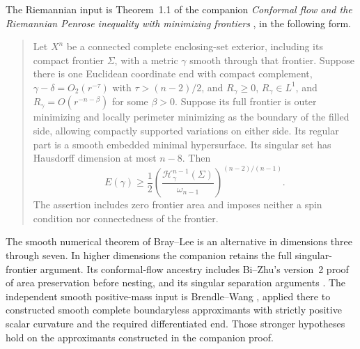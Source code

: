 The Riemannian input is Theorem~1.1 of the companion
\emph{Conformal flow and the Riemannian Penrose inequality with minimizing
frontiers} \cite{RiemannianCompanion}, in the following form.
\begin{quote}
Let $X^n$ be a connected complete enclosing-set exterior, including its
compact frontier $\Sigma$, with a metric $\gamma$ smooth through that
frontier. Suppose there is one Euclidean coordinate end with compact
complement, $\gamma-\delta=O_2(r^{-\tau})$ with
$\tau>(n-2)/2$, and
$R_\gamma\ge0$, $R_\gamma\in L^1$, and
$R_\gamma=O(r^{-n-\beta})$ for some $\beta>0$. Suppose its full frontier
is outer minimizing and locally perimeter minimizing as the boundary
of the filled side, allowing compactly supported variations on either side.
Its regular part is a smooth embedded minimal hypersurface. Its
singular set has Hausdorff dimension at most $n-8$. Then
\[
 E(\gamma)\ge\frac12
 \left(\frac{\mathcal H^{n-1}_\gamma(\Sigma)}{\omega_{n-1}}
 \right)^{(n-2)/(n-1)}.
\]
The assertion includes zero frontier area and imposes neither a spin
condition nor connectedness of the frontier.
\end{quote}

The smooth numerical theorem of Bray--Lee
\cite[Theorem~1.4]{BrayLee2009} is an alternative in dimensions three
through seven. In higher dimensions the companion retains the full
singular-frontier argument. Its conformal-flow ancestry includes Bi--Zhu's
version~2 proof of area preservation before nesting, and its singular
separation arguments
\cite{BiZhu2026v2}. The independent smooth positive-mass input is
Brendle--Wang \cite[Corollary~1.6]{BrendleWang2026}, applied there to
constructed smooth complete boundaryless approximants with strictly
positive scalar curvature and the required differentiated end. Those stronger hypotheses hold on the approximants constructed in the
companion proof.

